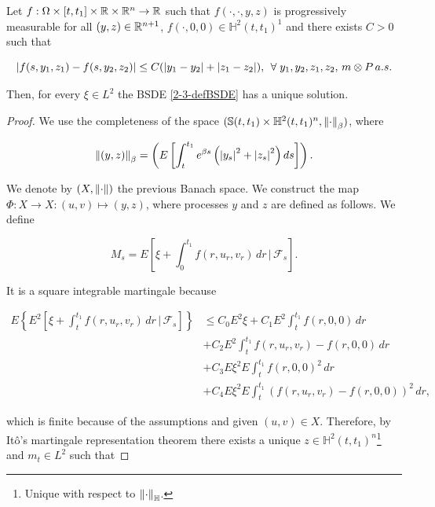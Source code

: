 \begin{theorem}
    Let $f:\Omega\times[t,t_1]\times\mathbb{R}\times\mathbb{R}^n\rightarrow \mathbb{R}$ such that $f(\cdot,\cdot,y,z)$ is progressively measurable for all 
    $(y,z)\in\mathbb{R}^{n+1}$, $f(\cdot,0,0)\in\mathbb{H}^2(t,t_1)^1$ and there exists $C>0$ such that

    \begin{equation}
        \abs{f(s,y_1,z_1)-f(s,y_2,z_2)} \leq C(\abs{y_1-y_2} + \abs{z_1-z_2}),\,\forall y_1,y_2,z_1,z_2,\, m\otimes P\,a.s.
    \end{equation}

    Then, for every $\xi\in L^2$ the BSDE \eqref{2-3-defBSDE} has a unique solution.

    \begin{proof}
        We use the completeness of the space $(\mathbb{S}(t,t_1)\times\mathbb{H}^2(t,t_1)^n, \norm{\cdot}_{\beta})$, where

        \begin{equation*}
            \norm{(y,z)}_{\beta} = \left(E\left[\int_t^{t_1} e^{\beta s}\left(\abs{y_s}^2+\abs{z_s}^2\right)ds\right]\right).
        \end{equation*}

        We denote by $(X,\norm{\cdot})$ the previous Banach space. We construct the map 
        $\Phi:X\rightarrow X:(u,v)\mapsto(y,z)$, where processes $y$ and $z$ are defined as follows. We define

        \begin{equation}
            M_s = E\left[\xi + \int_0^{t_1} f(r,u_r,v_r)\,dr\,|\,\mathcal{F}_s\right].
        \end{equation}

        It is a square integrable martingale because
        
        \begin{align*}
            E\left\{E^2\left[\xi + \int_t^{t_1} f(r,u_r,v_r)\,dr\,|\,\mathcal{F}_s\right]\right\} & \leq C_0 E^2\xi + C_1E^2\int_t^{t_1} f(r,0,0)\,dr \\
            & + C_2E^2\int_t^{t_1} f(r,u_r,v_r)-f(r,0,0)\,dr \\
            & + C_3E\xi^2E\int_t^{t_1}f(r,0,0)^2\,dr \\
            & + C_4E\xi^2E\int_t^{t_1}(f(r,u_r,v_r)-f(r,0,0))^2\,dr, 
        \end{align*}

        which is finite because of the assumptions and given $(u,v)\in X$. Therefore, by 
        It\^o's martingale representation theorem there exists a unique $z\in\mathbb{H}^2(t,t_1)^n$\footnote{Unique with respect to $\norm{\cdot}_{\mathbb{H}}$.} and $m_t\in L^2$ such that
        

\end{proof}
\end{theorem}
